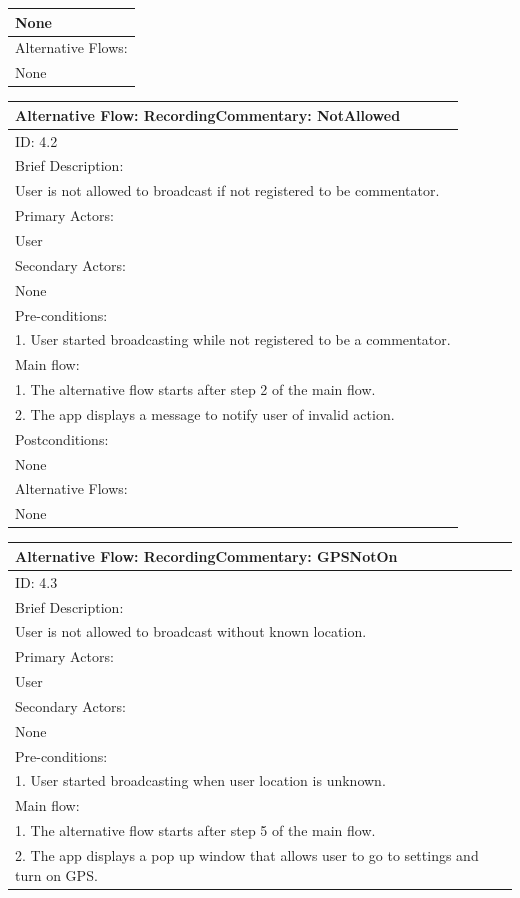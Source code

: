 \documentclass{article}
\begin{document}
\begin{flushleft}
\begin{longtable}[l]{|l|}
None\\
\hline
Alternative Flows:\\
None\\
\hline
\end{longtable}
\begin{longtable}[l]{|l|}
\hline
Alternative Flow: RecordingCommentary: NotAllowed\\
\hline
ID: 4.2\\
\hline
Brief Description: \\
User is not allowed to broadcast if not registered to be commentator.\\
\hline
Primary Actors:\\
User\\
\hline
Secondary Actors:\\
None\\
\hline
Pre-conditions:\\
1. User started broadcasting while not registered to be a commentator.\\
\hline
Main flow:\\
1. The alternative flow starts after step 2 of the main flow.\\
2. The app displays a message to notify user of invalid action.\\
\hline
Postconditions:\\
None\\
\hline
Alternative Flows:\\
None\\
\hline
\end{longtable}
\begin{longtable}[l]{|l|}
\hline
Alternative Flow: RecordingCommentary: GPSNotOn\\
\hline
ID: 4.3\\
\hline
Brief Description: \\
User is not allowed to broadcast without known location.\\
\hline
Primary Actors:\\
User\\
\hline
Secondary Actors:\\
None\\
\hline
Pre-conditions:\\
1. User started broadcasting when user location is unknown.\\
\hline
Main flow:\\
1. The alternative flow starts after step 5 of the main flow.\\
2. The app displays a pop up window that allows user to go to settings and turn on GPS.\\

\end{longtable}
\end{flushleft}
\end{document}
